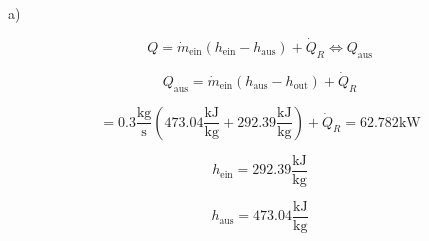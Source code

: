 a)

\[
Q = \dot{m}_{\text{ein}} (h_{\text{ein}} - h_{\text{aus}}) + \dot{Q}_R \iff Q_{\text{aus}}
\]

\[
Q_{\text{aus}} = \dot{m}_{\text{ein}} (h_{\text{aus}} - h_{\text{out}}) + \dot{Q}_R
\]

\[
= 0.3 \frac{\text{kg}}{\text{s}} (473.04 \frac{\text{kJ}}{\text{kg}} + 292.39 \frac{\text{kJ}}{\text{kg}}) + \dot{Q}_R = 62.782 \text{kW}
\]

\[
h_{\text{ein}} = 292.39 \frac{\text{kJ}}{\text{kg}}
\]

\[
h_{\text{aus}} = 473.04 \frac{\text{kJ}}{\text{kg}}
\]